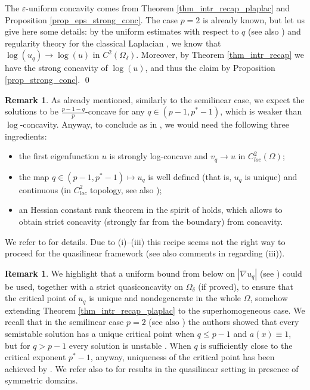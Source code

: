 \documentclass[11pt, reqno]{amsart}
\theoremstyle{definition}
\newtheorem{remark}[lemma]{Remark}
\numberwithin{equation}{section}
\def\eps{\varepsilon}
\renewenvironment{proof}[1][\proofname]{\medskip \noindent {\bfseries #1. }}{\qed \bigskip}
\begin{document}
\begin{proof}
The $\eps$-uniform concavity comes from Theorem \ref{thm_intr_recap_plaplac} and Proposition \ref{prop_eps_strong_conc}. 
The case $p=2$ is already known, but let us give here some details: by the uniform estimates with respect to $q$ (see also \cite[Proposition 2.4 and Theorem 2.5]{BrLi23}) and regularity theory for the classical Laplacian \cite[Theorem 2.30]{FrRo22}, we know that $\log(u_q) \to \log(u)$ in $C^2(\Omega_{\delta})$. 
Moreover, by Theorem \ref{thm_intr_recap} we have the strong concavity of $\log(u)$, and thus the claim by Proposition \ref{prop_strong_conc}.
\end{proof}


\begin{remark}
\label{rem_lin_argument}
As already mentioned, similarly to the semilinear case, we expect the solutions to be $\frac{p-1-q}{p}$-concave for any $q \in (p-1, p^*-1)$, which is weaker than $\log$-concavity. Anyway, to conclude as in \cite{Lin94}, we would need the following three ingredients:
\begin{itemize}
\item[(i)] the first eigenfunction $u$ is strongly log-concave and $v_q \to u$ in $C^2_{loc}(\Omega)$;
\item[(ii)] the map $q \in (p-1, p^*-1)\mapsto u_q$ is well defined (that is, $u_q$ is unique) and continuous (in $C^2_{loc}$ topology, see also \cite{BrLi23});
\item[(iii)] an Hessian constant rank theorem in the spirit of \cite{KoLe87} holds, which allows to obtain strict concavity (strongly far from the boundary) from concavity.
\end{itemize}
We refer to \cite{GMsS24, Lin94} for details.
Due to (i)--(iii) this recipe seems not the right way to proceed for the quasilinear framework (see also comments in \cite{BMS23} regarding (iii)).
\end{remark}


\begin{remark}
We highlight that a uniform bound from below on $|\nabla u_q|$ (see \cite[Theorem 2.5]{BrLi23}) could be used, together with a strict quasiconcavity on $\Omega_{\delta}$ (if proved), to ensure that the critical point of $u_q$ is unique and nondegenerate in the whole $\Omega$, somehow extending Theorem \ref{thm_intr_recap_plaplac} to the superhomogeneous case.
We recall that in the semilinear case $p=2$ \cite{CaCh98} (see also \cite{DGM21}) the authors showed that every semistable solution has a unique critical point when $q \leq p-1$ and $a(x) \equiv 1$, but for $q>p-1$ every solution is unstable \cite[Theorem 2]{KaSi01}. 
When $q$ is sufficiently close to the critical exponent $p^*-1$, anyway, uniqueness of the critical point has been achieved by \cite{GlGr04}.
We refer also to \cite[Theorem 6.1]{Sci07} for results in the quasilinear setting in presence of symmetric domains.
\end{remark}
\end{document}
